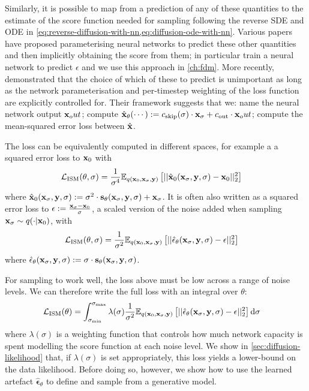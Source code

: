 Similarly, it is possible to map from a prediction of any of these quantities to the estimate of the score function needed for sampling following the reverse SDE and ODE in \cref{eq:reverse-diffusion-with-nn,eq:diffusion-ode-with-nn}. Various papers have proposed parameterising neural networks to predict these other quantities~\cite{ho2020denoising,sohl2015deep} and then implicitly obtaining the score from them; in particular \citet{ho2020denoising} train a neural network to predict $\epsilon$ and we use this approach in \cref{ch:fdm}. More recently, \citet{karras2022elucidating} demonstrated that the choice of which of these to predict is unimportant as long as the network parameterisation and per-timestep weighting of the loss function are explicitly controlled for. Their framework suggests that we: name the neural network output ${\mathbf{x}}_out$; compute $\hat{{\mathbf{x}}}_\theta(\cdots) := c_\text{skip}(\sigma) \cdot {\mathbf{x}}_\sigma + c_\text{out} \cdot {\mathbf{x}}_out$; compute the mean-squared error loss between $\hat{{\mathbf{x}}}$.

The loss can be equivalently computed in different spaces, for example a a squared error loss to ${\mathbf{x}}_0$ with
\begin{align}
    \mathcal{L}_\text{ISM}(\theta, \sigma) &= \frac{1}{\sigma^4} \mathbb{E}_{q({\mathbf{x}}_0, {\mathbf{x}}_\sigma, {\mathbf{y}})} \left[ 
    || \hat{{\mathbf{x}}}_0({\mathbf{x}}_\sigma, {\mathbf{y}}, \sigma) - {\mathbf{x}}_0 ||_2^2 \right]
\end{align}
where $\hat{{\mathbf{x}}}_0({\mathbf{x}}_\sigma, {\mathbf{y}}, \sigma) := \sigma^2 \cdot {\mathbf{s}}_\theta({\mathbf{x}}_\sigma, {\mathbf{y}}, \sigma) + {\mathbf{x}}_\sigma$. 
It is often also written as a squared error loss to $\epsilon := \frac{{\mathbf{x}}_\sigma - {\mathbf{x}}_0}{\sigma}$, a scaled version of the noise added when sampling ${\mathbf{x}}_\sigma \sim q(\cdot|{\mathbf{x}}_0)$, with
\begin{align}
    \mathcal{L}_\text{ISM}(\theta, \sigma) &= \frac{1}{\sigma^2} \mathbb{E}_{q({\mathbf{x}}_0, {\mathbf{x}}_\sigma, {\mathbf{y}})} \left[ 
    || \hat{\mathbf{\epsilon}}_\theta({\mathbf{x}}_\sigma, {\mathbf{y}}, \sigma) - \epsilon ||_2^2 \right]
\end{align}
where $\hat{\mathbf{\epsilon}}_\theta({\mathbf{x}}_\sigma, {\mathbf{y}}, \sigma) := \sigma \cdot {\mathbf{s}}_\theta({\mathbf{x}}_\sigma, {\mathbf{y}}, \sigma)$.

For sampling to work well, the loss above must be low across a range of noise levels. We can therefore write the full loss with an integral over $\theta$:
\begin{align} \label{eq:diffusion-loss-all-sigma}
    \mathcal{L}_\text{ISM}(\theta) &= \int_{\sigma_\text{min}}^{\sigma_\text{max}} \lambda(\sigma) \frac{1}{\sigma^2} \mathbb{E}_{q({\mathbf{x}}_0, {\mathbf{x}}_\sigma, {\mathbf{y}})} \left[ 
    || \hat{\mathbf{\epsilon}}_\theta({\mathbf{x}}_\sigma, {\mathbf{y}}, \sigma) - \epsilon ||_2^2 \right] \mathrm{d}\sigma
\end{align}
where $\lambda(\sigma)$ is a weighting function that controls how much network capacity is spent modelling the score function at each noise level. We show in \cref{sec:diffusion-likelihood} that, if $\lambda(\sigma)$ is set appropriately, this loss yields a lower-bound on the data likelihood. Before doing so, however, we show how to use the learned artefact $\hat{\mathbf{\epsilon}}_\theta$ to define and sample from a generative model.



